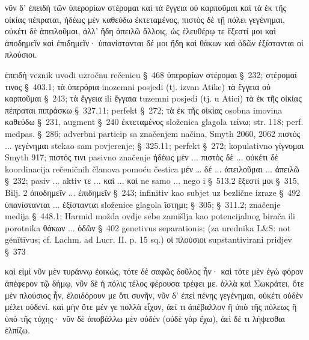 
{\large
\begin{greek}
\noindent νῦν δ' 
ἐπειδὴ τῶν ὑπερορίων στέρομαι 
καὶ τὰ ἔγγεια οὐ καρποῦμαι 
καὶ τὰ ἐκ τῆς οἰκίας πέπραται, 
ἡδέως μὲν καθεύδω ἐκτεταμένος, 
πιστὸς δὲ τῇ πόλει γεγένημαι, 
οὐκέτι δὲ ἀπειλοῦμαι, 
ἀλλ' ἤδη ἀπειλῶ ἄλλοις, 
ὡς ἐλευθέρῳ τε ἔξεστί μοι 
καὶ ἀποδημεῖν καὶ ἐπιδημεῖν· 
ὑπανίστανται δέ μοι ἤδη καὶ θάκων 
καὶ ὁδῶν ἐξίστανται οἱ πλούσιοι.

\end{greek}
}

\begin{description}[noitemsep]
ἐπειδὴ	veznik uvodi uzročnu rečenicu §~468
ὑπερορίων στέρομαι	§~232; στέρομαί τινος §~403.1; τὰ ὑπερόρια inozemni posjedi (tj. izvan Atike)
τὰ ἔγγεια οὐ καρποῦμαι	§~243; τὰ ἔγγεια ili ἔγγαια tuzemni posjedi (tj. u Atici)
τὰ ἐκ τῆς οἰκίας πέπραται	πιπράσκω §~327.11; perfekt §~272; τὰ ἐκ τῆς οἰκίας osobna imovina
καθεύδω	§~231, augment §~240 
ἐκτεταμένος	složenica glagola τείνω; str. 118; perf. medpas. §~286; adverbni particip sa značenjem načina, Smyth 2060, 2062
πιστὸς ... γεγένημαι	stekao sam povjerenje; §~325.11; perfekt §~272; kopulativno γίγνομαι Smyth 917; πιστός τινι pasivno značenje
ἡδέως μὲν ... πιστὸς δὲ ... 
οὐκέτι δὲ	koordinacija rečeničnih članova pomoću čestica μέν … δέ ...
ἀπειλοῦμαι ... ἀπειλῶ	§~232; pasiv ... aktiv
τε ... καὶ ... καὶ 	ne samo ... nego i §~513.2 
ἔξεστί μοι	§~315, Bilj. 2
ἀποδημεῖν ... ἐπιδημεῖν	§~243; infinitiv kao subjet uz bezlične izraze §~492
ὑπανίστανται ... ἐξίστανται 	složenice glagola ἵστημι; §~305; §~311.2; značenje medija §~448.1; Harmid možda ovdje sebe zamišlja kao potencijalnog birača ili porotnika
θάκων ... ὁδῶν	§~402 genetivus separationis; (za urednika L&S: not gĕnĭtīvus; cf. Lachm. ad Lucr. II. p. 15 sq.)
οἱ πλούσιοι	supstantivirani pridjev §~373
\end{description}


{\large
\begin{greek}
\noindent καὶ εἰμὶ νῦν μὲν τυράννῳ ἐοικώς, 
τότε δὲ 
σαφῶς δοῦλος ἦν· 
καὶ τότε μὲν ἐγὼ 
φόρον ἀπέφερον τῷ δήμῳ, 
νῦν δὲ ἡ πόλις 
τέλος φέρουσα 
τρέφει με. 
ἀλλὰ καὶ Σωκράτει, 
ὅτε μὲν πλούσιος ἦν, 
ἐλοιδόρουν με 
ὅτι συνῆν, 
νῦν δ' 
ἐπεὶ πένης γεγένημαι, 
οὐκέτι οὐδὲν μέλει οὐδενί. 
καὶ μὴν 
ὅτε μέν γε πολλὰ εἶχον, 
ἀεί τι ἀπέβαλλον 
ἢ ὑπὸ τῆς πόλεως 
ἢ ὑπὸ τῆς τύχης· 
νῦν δὲ 
ἀποβάλλω μὲν οὐδέν 
(οὐδὲ γὰρ ἔχω), 
ἀεὶ δέ τι λήψεσθαι 
ἐλπίζω.

\end{greek}
}

